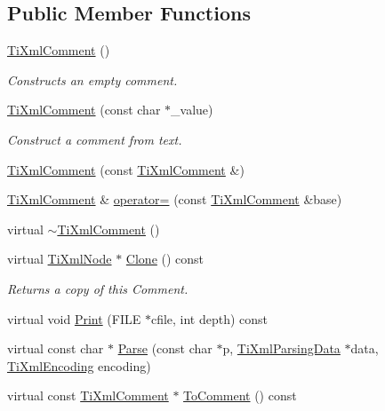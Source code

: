 \subsection*{Public Member Functions}
\begin{DoxyCompactItemize}
\item 
\hyperlink{class_ti_xml_comment_aaa3252031d3e8bd3a2bf51a1c61201b7}{Ti\-Xml\-Comment} ()
\begin{DoxyCompactList}\small\item\em Constructs an empty comment. \end{DoxyCompactList}\item 
\hyperlink{class_ti_xml_comment_a37e7802ef17bc03ebe5ae79bf0713d47}{Ti\-Xml\-Comment} (const char $\ast$\-\_\-value)
\begin{DoxyCompactList}\small\item\em Construct a comment from text. \end{DoxyCompactList}\item 
\hyperlink{class_ti_xml_comment_afaec41ac2760ce946ba1590eb5708e50}{Ti\-Xml\-Comment} (const \hyperlink{class_ti_xml_comment}{Ti\-Xml\-Comment} \&)
\item 
\hyperlink{class_ti_xml_comment}{Ti\-Xml\-Comment} \& \hyperlink{class_ti_xml_comment_aeceedc15f8b8f9ca0b6136696339b3ac}{operator=} (const \hyperlink{class_ti_xml_comment}{Ti\-Xml\-Comment} \&base)
\item 
virtual \hyperlink{class_ti_xml_comment_a3264ae2e9c4a127edfa03289bb2c9aa2}{$\sim$\-Ti\-Xml\-Comment} ()
\item 
virtual \hyperlink{class_ti_xml_node}{Ti\-Xml\-Node} $\ast$ \hyperlink{class_ti_xml_comment_a4f6590c9c9a2b63a48972655b78eb853}{Clone} () const 
\begin{DoxyCompactList}\small\item\em Returns a copy of this Comment. \end{DoxyCompactList}\item 
virtual void \hyperlink{class_ti_xml_comment_a17398061d62c470f57801ce28fa33ad4}{Print} (F\-I\-L\-E $\ast$cfile, int depth) const 
\item 
virtual const char $\ast$ \hyperlink{class_ti_xml_comment_a43bddc18ac057734b41d84653b71d3e0}{Parse} (const char $\ast$p, \hyperlink{class_ti_xml_parsing_data}{Ti\-Xml\-Parsing\-Data} $\ast$data, \hyperlink{tinyxml_8h_a88d51847a13ee0f4b4d320d03d2c4d96}{Ti\-Xml\-Encoding} encoding)
\item 
virtual const \hyperlink{class_ti_xml_comment}{Ti\-Xml\-Comment} $\ast$ \hyperlink{class_ti_xml_comment_a00fb4215c20a2399ea05ac9b9e7e68a0}{To\-Comment} () const 

\end{DoxyCompactItemize}
